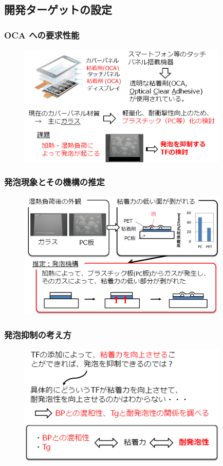 \documentclass[12pt, dvipdfmx]{beamer}
\begin{document}
\subsection{開発ターゲットの設定}
\begin{frame}
	\frametitle{OCA への要求性能}
	\begin{figure}
		\begin{center}
			\includegraphics[width=100mm]{target.png}
		\end{center}
	\end{figure}
\end{frame}


%
\begin{frame}\frametitle{発泡現象とその機構の推定}
	\begin{figure}
		\begin{center}
			\includegraphics[width=100mm]{PC_delami.png}
		\end{center}
	\end{figure}
\end{frame}

\begin{frame}\frametitle{発泡抑制の考え方}
	\begin{figure}
		\begin{center}
			\includegraphics[width=100mm]{aproach.png}
		\end{center}
	\end{figure}
\end{frame}
\end{document}
